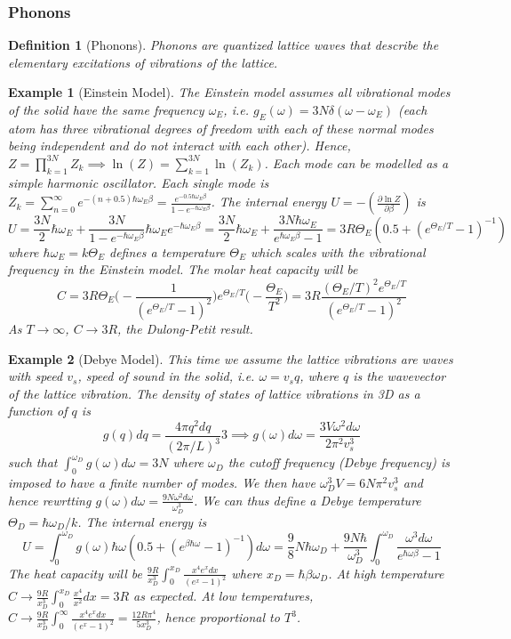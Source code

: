 \documentclass[a4paper]{article}
\newtheorem{defi}{Definition}[section]
\newtheorem{eg}{Example}[section]
\theoremstyle{new}
\begin{document}
\subsubsection*{Phonons}
\begin{defi}[Phonons]
Phonons are quantized lattice waves that describe the elementary excitations of vibrations of the lattice.
\end{defi}
\begin{eg}[Einstein Model]
The Einstein model assumes all vibrational modes of the solid have the same frequency $\omega_E$, i.e. $g_E(\omega)=3N\delta(\omega-\omega_E)$ (each atom has three vibrational degrees of freedom with each of these normal modes being independent and do not interact with each other). Hence, $Z=\prod_{k=1}^{3N}Z_k\implies\ln(Z)=\sum_{k=1}^{3N}\ln(Z_k)$. Each mode can be modelled as a simple harmonic oscillator. Each single mode is $Z_k=\sum_{n=0}^\infty e^{-(n+0.5)\hbar\omega_E\beta}=\frac{e^{-0.5\hbar\omega_E\beta}}{1-e^{-\hbar\omega_E\beta}}$. The internal energy $U=-(\frac{\partial\ln Z}{\partial\beta})$ is
$$U=\frac{3N}{2}\hbar\omega_E+\frac{3N}{1-e^{-\hbar\omega_E\beta}}\hbar\omega_Ee^{-\hbar\omega_E\beta}=\frac{3N}{2}\hbar\omega_E+\frac{3N\hbar\omega_E}{e^{\hbar\omega_E\beta}-1}=3R\Theta_E(0.5+(e^{\Theta_E/T}-1)^{-1})$$
where $\hbar\omega_E=k\Theta_E$ defines a temperature $\Theta_E$ which scales with the vibrational frequency in the Einstein model. The molar heat capacity will be
$$C=3R\Theta_E\bigg(-\frac{1}{(e^{\Theta_E/T}-1)^2}\bigg)e^{\Theta_E/T}\bigg(-\frac{\Theta_E}{T^2}\bigg)=3R\frac{(\Theta_E/T)^2e^{\Theta_E/T}}{(e^{\Theta_E/T}-1)^2}$$
As $T\rightarrow\infty$, $C\rightarrow 3R$, the Dulong-Petit result.
\end{eg}
\begin{eg}[Debye Model]
This time we assume the lattice vibrations are waves with speed $v_s$, speed of sound in the solid, i.e. $\omega=v_sq$, where $q$ is the wavevector of the lattice vibration. The density of states of lattice vibrations in 3D as a function of $q$ is
$$g(q)dq=\frac{4\pi q^2dq}{(2\pi/L)^3}3\implies g(\omega)d\omega=\frac{3V\omega^2d\omega}{2\pi^2v_s^3}$$
such that $\int_0^{\omega_D}g(\omega)d\omega=3N$ where $\omega_D$ the cutoff frequency (Debye frequency) is imposed to have a finite number of modes. We then have $\omega_D^3V=6N\pi^2v_s^3$ and hence rewrtting $g(\omega)d\omega=\frac{9N\omega^2d\omega}{\omega_D^3}$. We can thus define a Debye temperature $\Theta_D=\hbar\omega_D/k$. The internal energy is 
$$U=\int_0^{\omega_D}g(\omega)\hbar\omega(0.5+(e^{\beta\hbar\omega}-1)^{-1})d\omega=\frac{9}{8}N\hbar\omega_D+\frac{9N\hbar}{\omega_D^3}\int_0^{\omega_D}\frac{\omega^3d\omega}{e^{\hbar\omega\beta}-1}$$
The heat capacity will be $\frac{9R}{x_D^3}\int_0^{x_D}\frac{x^4e^xdx}{(e^x-1)^2}$ where $x_D=\hbar\beta\omega_D$. At high temperature $C\rightarrow\frac{9R}{x_D^3}\int_0^{x_D}\frac{x^4}{x^2}dx=3R$ as expected. At low temperatures, $C\rightarrow\frac{9R}{x_D^3}\int_0^\infty\frac{x^4e^xdx}{(e^x-1)^2}=\frac{12R\pi^4}{5x_D^3}$, hence proportional to $T^3$.
\end{eg}
\end{document}
